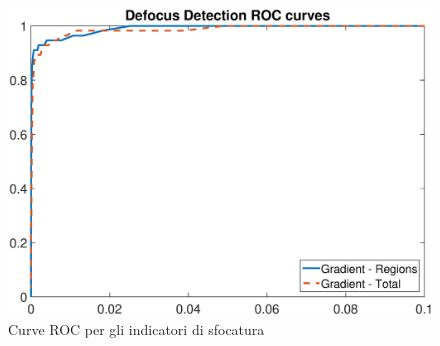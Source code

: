 %
\begin{figure}[tb]
\centering
\includegraphics[width=13cm]{diagrammi/ROC_defocus}
\caption{Curve ROC per gli indicatori di sfocatura}
\label{fig:ROC_defocus}
\end{figure}

